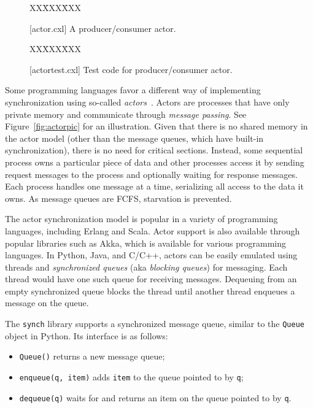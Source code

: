 \documentclass{report}
\newcommand{\cxlsource}[1]{
\begin{tabbing}
XX\=XXX\=XXX\kill
    
\end{tabbing}
}
\newenvironment{code}{
\tcolorbox
}{
\endtcolorbox
}
\begin{document}
\begin{figure}
\begin{code}
\cxlsource{actor}
\end{code}
\caption{[actor.cxl] A producer/consumer actor.}
\label{fig:actor}
\end{figure}

\begin{figure}
\begin{code}
\cxlsource{actortest}
\end{code}
\caption{[actortest.cxl] Test code for producer/consumer actor.}
\label{fig:actortest}
\end{figure}

Some programming languages favor a different way of implementing
synchronization using so-called \emph{actors}~\cite{HBS73}.  Actors are
processes that have only private memory and communicate through
\emph{message passing}.
See Figure~\ref{fig:actorpic} for an illustration.
Given that there is no shared memory in the actor model (other than the message
queues, which have built-in synchronization), there is no need
for critical sections.  Instead, some sequential process owns a particular
piece of data and other processes access it by sending request messages
to the process and optionally waiting for response messages.  Each process
handles one message at a time, serializing all access to the data it owns.
As message queues are FCFS, starvation is prevented.

The actor synchronization model is popular in a variety of programming
languages, including Erlang and Scala.  Actor support is also available
through popular libraries such as Akka, which is available for various
programming languages.  In Python, Java, and C/C++,
actors can be easily emulated using threads and \emph{synchronized queues}
(aka \emph{blocking queues})
for messaging.
Each thread would have one such queue for receiving messages.
Dequeuing from an empty synchronized queue blocks the thread until
another thread enqueues a message on the queue.

The \texttt{synch} library supports a synchronized message queue,
similar to the \texttt{Queue} object in Python.
Its interface is as follows:
\begin{itemize}
\item \texttt{Queue()} returns a new message queue;
\item \texttt{enqueue(q, item)} adds \texttt{item} to the queue pointed to by \texttt{q};
\item \texttt{dequeue(q)} waits for and returns an item on the queue pointed to by \texttt{q}.
\end{itemize}
\end{document}
